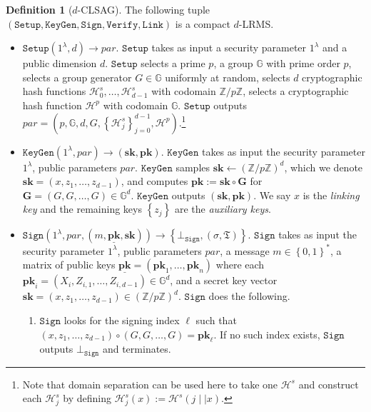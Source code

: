 \documentclass{article}
\theoremstyle{plain}
\theoremstyle{definition}
\newtheorem{defn}{Definition}[section]
\begin{document}
\begin{defn}[$d$-CLSAG]\label{def:clsag}
The following tuple $(\texttt{Setup}, \texttt{KeyGen}, \texttt{Sign}, \texttt{Verify}, \texttt{Link})$ is a compact $d$-LRMS.

\begin{itemize}
\item $\texttt{Setup}(1^\lambda, d) \to \textit{par}$. $\texttt{Setup}$ takes as input a security parameter $1^\lambda$ and a public dimension $d$. $\texttt{Setup}$ selects a prime $p$, a group $\mathbb{G}$ with prime order $p$, selects a group generator $G \in \mathbb{G}$ uniformly at random, selects $d$ cryptographic hash functions $\mathcal{H}^s_0, \ldots, \mathcal{H}^s_{d-1}$ with codomain $\mathbb{Z}/p\mathbb{Z}$, selects a cryptographic hash function $\mathcal{H}^p$ with codomain $\mathbb{G}$. $\texttt{Setup}$ outputs $\textit{par} = \left( p,\mathbb{G}, d, G, \left\{\mathcal{H}^s_j\right\}_{j=0}^{d-1}, \mathcal{H}^p\right)$.\footnote{Note that domain separation can be used here to take one $\mathcal{H}^s$ and construct each $\mathcal{H}^s_j$ by defining $\mathcal{H}^s_j(x) := \mathcal{H}^s(j \mid\mid x)$.}

\item $\texttt{KeyGen}(1^\lambda, \textit{par}) \to (\textbf{sk}, \textbf{pk})$. $\texttt{KeyGen}$ takes as input the security parameter $1^\lambda$, public parameters $\textit{par}$. $\texttt{KeyGen}$ samples $\textbf{sk} \leftarrow (\mathbb{Z}/p\mathbb{Z})^d$, which we denote $\textbf{sk} = (x, z_1, \ldots, z_{d-1})$, and computes $\textbf{pk} := \textbf{sk} \circ \textbf{G}$ for $\textbf{G} = (G, G, \ldots, G) \in \mathbb{G}^d$. $\texttt{KeyGen}$ outputs $(\textbf{sk}, \textbf{pk})$. We say $x$ is the \textit{linking key} and the remaining keys $\left\{z_j\right\}$ are the \textit{auxiliary keys}.

\item $\texttt{Sign}\left(1^\lambda, \textit{par}, (m, \underline{\textbf{pk}}, \textbf{sk})\right) \to \left\{\bot_{\texttt{Sign}}, (\sigma, \mathfrak{T})\right\}$. $\texttt{Sign}$ takes as input the security parameter $1^\lambda$, public parameters $\textit{par}$, a message $m \in \left\{0,1\right\}^*$, a matrix of public keys $\underline{\textbf{pk}} = (\textbf{pk}_1, \ldots, \textbf{pk}_n)$ where each $\textbf{pk}_i = (X_i, Z_{i,1}, \ldots, Z_{i,d-1}) \in \mathbb{G}^d$, and a secret key vector $\textbf{sk} = (x,z_1, \ldots, z_{d-1}) \in (\mathbb{Z}/p\mathbb{Z})^d$. $\texttt{Sign}$ does the following.

\begin{enumerate}
\item $\texttt{Sign}$ looks for the signing index $\ell$ such that $(x, z_1, \ldots, z_{d-1}) \circ (G, G, \ldots, G) = \textbf{pk}_\ell$. If no such index exists, $\texttt{Sign}$ outputs $\bot_{\texttt{Sign}}$ and terminates.


\end{enumerate}
\end{itemize}
\end{defn}
\end{document}
